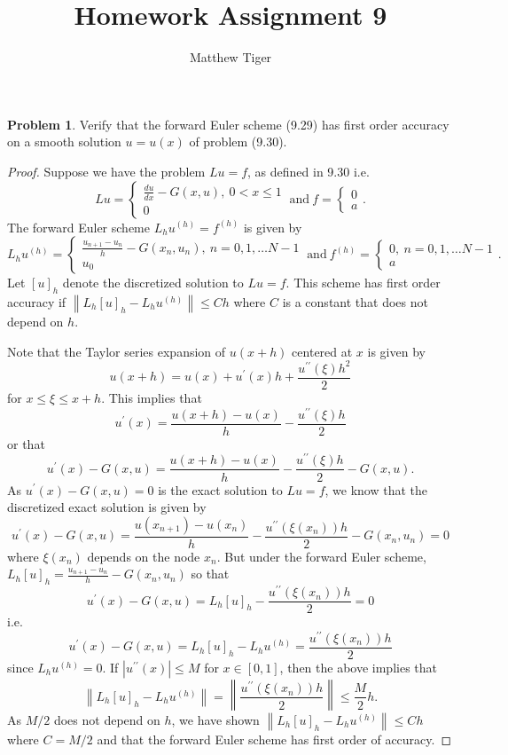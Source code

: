 \documentclass[12pt]{article}
\title{Homework Assignment 9}
\author{Matthew Tiger}
\theoremstyle{definition}
\newtheorem{problem}{Problem}
\newcommand\norm[1]{\left\lVert#1\right\rVert}
\begin{document}
\maketitle
\begin{problem} Verify that the forward Euler scheme (9.29) has first order
  accuracy on a smooth solution $u=u(x)$ of problem (9.30).
\end{problem}

\begin{proof}
  Suppose we have the problem $Lu = f$, as defined in 9.30 i.e.
  \[
      Lu =
      \begin{cases}
        \frac{du}{dx} - G(x, u),\ 0 < x \leq 1 \\
        0
      \end{cases}
      \ \text{and} \
      f =
      \begin{cases}
        0 \\
        a
      \end{cases}.
  \]
  The forward Euler scheme $L_hu^{(h)} = f^{(h)}$ is given by
  \[
      L_hu^{(h)} =
      \begin{cases}
        \frac{u_{n+1} - u_{n}}{h} - G(x_n, u_n),\  n = 0, 1, \dots N-1 \\
        u_0
      \end{cases}
      \ \text{and} \
      f^{(h)} =
      \begin{cases}
        0,\  n = 0, 1, \dots N-1 \\
        a
      \end{cases}.
  \]
  Let $[u]_h$ denote the discretized solution to $Lu = f$. This scheme has
  first order accuracy if $\norm{L_h[u]_h - L_hu^{(h)}} \leq C h$ where
  $C$ is a constant that does not depend on $h$.

  Note that the Taylor series expansion of $u(x + h)$ centered at $x$ is given by
  \[
    u(x + h) = u(x) + u^{\prime}(x) h + \frac{u^{\prime \prime}(\xi) h^2}{2}
  \]
  for $x \leq \xi \leq x+h$. This implies that
  \[
    u^{\prime}(x) = \frac{u(x+h) - u(x)}{h} - \frac{u^{\prime \prime}(\xi) h}{2}
  \]
  or that
  \[
    u^{\prime}(x) - G(x, u) = \frac{u(x+h) - u(x)}{h} - \frac{u^{\prime \prime}(\xi) h}{2} - G(x, u).
  \]
  As $u^{\prime}(x) - G(x, u) = 0$ is the exact solution to $Lu = f$, we know that the
  discretized exact solution is given by
  \[
    u^{\prime}(x) - G(x, u) = \frac{u(x_{n+1}) - u(x_n)}{h} - \frac{u^{\prime \prime}(\xi(x_n)) h}{2} - G(x_n, u_n) = 0
  \]
  where $\xi(x_n)$ depends on the node $x_n$. But under the forward Euler scheme,
  $L_h[u]_h = \frac{u_{n+1} - u_{n}}{h} - G(x_n, u_n)$ so that
  \[
    u^{\prime}(x) - G(x, u) = L_h[u]_h - \frac{u^{\prime \prime}(\xi(x_n)) h}{2} = 0
  \]
  i.e.
  \[
    u^{\prime}(x) - G(x, u) = L_h[u]_h - L_h u^{(h)} = \frac{u^{\prime \prime}(\xi(x_n)) h}{2}
  \]
  since $L_h u^{(h)} = 0$. If $|u^{\prime \prime}(x)| \leq M$ for $x \in [0, 1]$, then
  the above implies that
  \[
    \norm{L_h[u]_h - L_h u^{(h)}} = \norm{\frac{u^{\prime \prime}(\xi(x_n)) h}{2}} \leq \frac{M}{2} h.
  \]
  As $M/2$ does not depend on $h$, we have shown $\norm{L_h[u]_h - L_h u^{(h)}} \leq C h$
  where $C = M/2$ and that the forward Euler scheme has first order of accuracy.
\end{proof}
\end{document}
